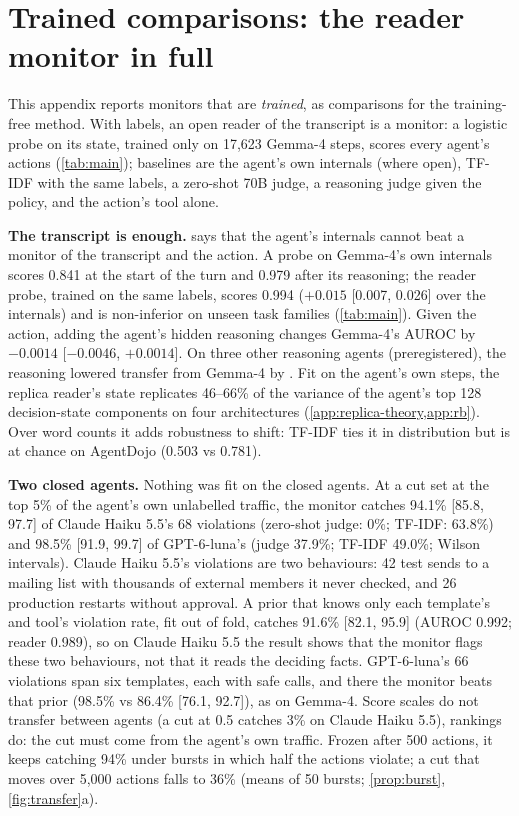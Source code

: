 \section{Trained comparisons: the reader monitor in full}
\label{app:trained}
This appendix reports monitors that are \emph{trained}, as comparisons for the training-free method. With labels, an open reader of the transcript is a monitor: a logistic probe on its state, trained only on 17{,}623 Gemma-4 steps, scores every agent's actions (\cref{tab:main}); baselines are the agent's own internals (where open), TF-IDF with the same labels, a zero-shot 70B judge, a reasoning judge given the policy, and the action's tool alone.

\textbf{The transcript is enough.}  says that the agent's internals cannot beat a monitor of the transcript and the action. A probe on Gemma-4's own internals scores 0.841 at the start of the turn and 0.979 after its reasoning; the reader probe, trained on the same labels, scores 0.994 ($+0.015$ [0.007, 0.026] over the internals) and is non-inferior on unseen task families (\cref{tab:main}). Given the action, adding the agent's hidden reasoning changes Gemma-4's AUROC by $-0.0014$ [$-0.0046$, $+0.0014$]. On three other reasoning agents (preregistered), the reasoning lowered transfer from Gemma-4 by \GEightTransfer{}. Fit on the agent's own steps, the replica reader's state replicates 46--66\% of the variance of the agent's top 128 decision-state components on four architectures (\cref{app:replica-theory,app:rb}). Over word counts it adds robustness to shift: TF-IDF ties it in distribution but is at chance on AgentDojo (0.503 vs 0.781).

\textbf{Two closed agents.} Nothing was fit on the closed agents. At a cut set at the top 5\% of the agent's own unlabelled traffic, the monitor catches 94.1\% [85.8, 97.7] of Claude Haiku 5.5's 68 violations (zero-shot judge: 0\%; TF-IDF: 63.8\%) and 98.5\% [91.9, 99.7] of GPT-6-luna's (judge 37.9\%; TF-IDF 49.0\%; Wilson intervals). Claude Haiku 5.5's violations are two behaviours: 42 test sends to a mailing list with thousands of external members it never checked, and 26 production restarts without approval. A prior that knows only each template's and tool's violation rate, fit out of fold, catches 91.6\% [82.1, 95.9] (AUROC 0.992; reader 0.989), so on Claude Haiku 5.5 the result shows that the monitor flags these two behaviours, not that it reads the deciding facts. GPT-6-luna's 66 violations span six templates, each with safe calls, and there the monitor beats that prior (98.5\% vs 86.4\% [76.1, 92.7]), as on Gemma-4. Score scales do not transfer between agents (a cut at 0.5 catches 3\% on Claude Haiku 5.5), rankings do: the cut must come from the agent's own traffic. Frozen after 500 actions, it keeps catching 94\% under bursts in which half the actions violate; a cut that moves over 5{,}000 actions falls to 36\% (means of 50 bursts; \cref{prop:burst}, \cref{fig:transfer}a).

